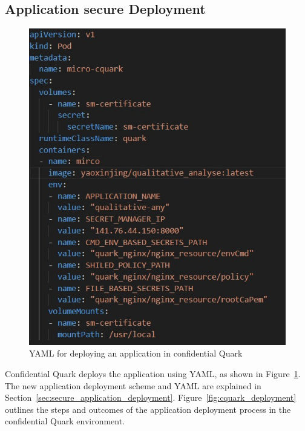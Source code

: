 \subsection{Application secure Deployment}
\begin{figure}[!htb]
    \centering
    \includegraphics[height=0.3\textheight]{images/cquark_deploy_yaml.jpg}
    \caption[YAML for deploying an application in confidential Quark]{YAML for deploying an application in confidential Quark}
    \label{fig:cquark_deploy_yaml}
\end{figure}

Confidential Quark deploys the application using YAML, as shown in Figure~\ref{fig:cquark_deploy_yaml}. The new application deployment scheme and YAML are explained in Section~\ref{sec:secure_application_deployment}. Figure~\ref{fig:cquark_deployment} outlines the steps and outcomes of the application deployment process in the confidential Quark environment.


